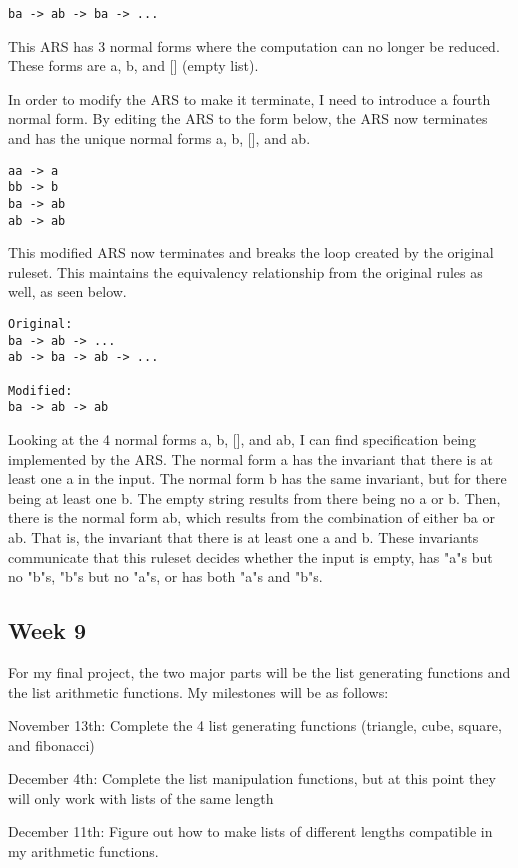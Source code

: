 \documentclass{article}
\theoremstyle{theorem}
\theoremstyle{definition}
\theoremstyle{remark}
\begin{document}
\begin{lstlisting}
ba -> ab -> ba -> ...
\end{lstlisting}
%
This ARS has 3 normal forms where the computation can no longer be reduced. These forms are a, b, and [] (empty list).

\medskip\noindent
In order to modify the ARS to make it terminate, I need to introduce a fourth normal form. By editing the ARS to the form below, the ARS now terminates and has the unique normal forms a, b, [], and ab.

\begin{lstlisting}
aa -> a
bb -> b
ba -> ab
ab -> ab
\end{lstlisting}
%
This modified ARS now terminates and breaks the loop created by the original ruleset. This maintains the equivalency relationship from the original rules as well, as seen below.

\begin{lstlisting}
Original:
ba -> ab -> ...
ab -> ba -> ab -> ...

Modified:
ba -> ab -> ab
\end{lstlisting}
%
Looking at the 4 normal forms a, b, [], and ab, I can find specification being implemented by the ARS. The normal form a has the invariant that there is at least one a in the input. The normal form b has the same invariant, but for there being at least one b. The empty string results from there being no a or b. Then, there is the normal form ab, which results from the combination of either ba or ab. That is, the invariant that there is at least one a and b. These invariants communicate that this ruleset decides whether the input is empty, has "a"s but no "b"s, "b"s but no "a"s, or has both "a"s and "b"s.

\subsection{Week 9}
For my final project, the two major parts will be the list generating functions and the list arithmetic functions. My milestones will be as follows:

\medskip\noindent
November 13th: Complete the 4 list generating functions (triangle, cube, square, and fibonacci)

\medskip\noindent
December 4th: Complete the list manipulation functions, but at this point they will only work with lists of the same length

\medskip\noindent
December 11th: Figure out how to make lists of different lengths compatible in my arithmetic functions.
\end{document}

